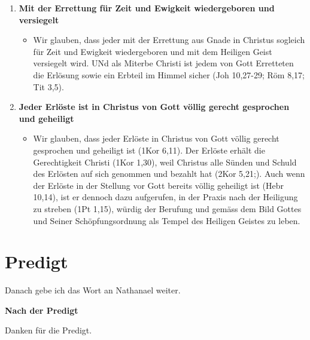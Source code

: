 \documentclass{../../inc/mybib}
\begin{document}
\begin{spacing}{1.5}
\begin{enumerate}
\begin{itemize}
            \end{itemize}
        \item \textbf{Mit der Errettung für Zeit und Ewigkeit wiedergeboren und versiegelt}        
            \begin{itemize}
                \item Wir glauben, dass jeder mit der Errettung aus Gnade in Christus sogleich für Zeit und Ewigkeit wiedergeboren und mit dem Heiligen Geist versiegelt wird. UNd als Miterbe Christi ist jedem von Gott Erretteten die Erlösung sowie ein Erbteil im Himmel sicher (Joh 10,27-29; Röm 8,17; Tit 3,5).               
            \end{itemize}              
            \newpage
        \item \textbf{Jeder Erlöste ist in Christus von Gott völlig gerecht gesprochen und geheiligt }
            \begin{itemize}
                \item Wir glauben, dass jeder Erlöste in Christus von Gott völlig gerecht gesprochen und geheiligt ist (1Kor 6,11). Der Erlöste erhält die Gerechtigkeit Christi (1Kor 1,30), weil Christus alle Sünden und Schuld des Erlösten auf sich genommen und bezahlt hat (2Kor 5,21;). Auch wenn der Erlöste in der Stellung vor Gott bereits völlig geheiligt ist (Hebr 10,14), ist er dennoch dazu aufgerufen, in der Praxis nach der Heiligung zu streben (1Pt 1,15), würdig der Berufung und gemäss dem Bild Gottes und Seiner Schöpfungsordnung als Tempel des Heiligen Geistes zu leben.              
            \end{itemize} 
\end{enumerate}
\end{spacing}

\section{Predigt}

Danach gebe ich das Wort an Nathanael weiter.

\textbf{Nach der Predigt}

Danken für die Predigt.



\end{document}
